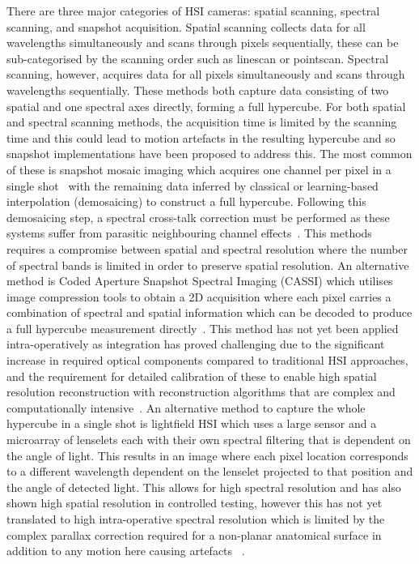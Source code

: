 There are three major categories of HSI cameras: spatial scanning, spectral scanning, and snapshot acquisition. Spatial scanning collects data for all wavelengths simultaneously and scans through pixels sequentially, these can be sub-categorised by the scanning order such as linescan or pointscan. Spectral scanning, however, acquires data for all pixels simultaneously and scans through wavelengths sequentially. These methods both capture data consisting of two spatial and one spectral axes directly, forming a full hypercube. For both spatial and spectral scanning methods, the acquisition time is limited by the scanning time and this could lead to motion artefacts in the resulting hypercube and so snapshot implementations have been proposed to address this. The most common of these is snapshot mosaic imaging which acquires one channel per pixel in a single shot~\cite{Geelen2014} with the remaining data inferred by classical or learning-based~\cite{Li2021} interpolation (demosaicing) to construct a full hypercube. Following this demosaicing step, a spectral cross-talk correction must be performed as these systems suffer from parasitic neighbouring channel effects~\cite{Pichette2017}. This methods requires a compromise between spatial and spectral resolution where the number of spectral bands is limited in order to preserve spatial resolution. An alternative method is Coded Aperture Snapshot Spectral Imaging (CASSI) which utilises image compression tools to obtain a 2D acquisition where each pixel carries a combination of spectral and spatial information which can be decoded to produce a full hypercube measurement directly~\cite{Song2022, Eldar2009}. This method has not yet been applied intra-operatively as integration has proved challenging due to the significant increase in required optical components compared to traditional HSI approaches, and the requirement for detailed calibration of these to enable high spatial resolution reconstruction with reconstruction algorithms that are complex and computationally intensive~\cite{Song2022}. An alternative method to capture the whole hypercube in a single shot is lightfield HSI which uses a large sensor and a microarray of lenselets each with their own spectral filtering that is dependent on the angle of light. This results in an image where each pixel location corresponds to a different wavelength dependent on the lenselet projected to that position and the angle of detected light. This allows for high spectral resolution and has also shown high spatial resolution in controlled testing, however this has not yet translated to high intra-operative spectral resolution which is limited by the complex parallax correction required for a non-planar anatomical surface in addition to any motion here causing artefacts~
\cite{MacCormac2023}.  

